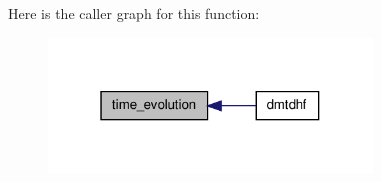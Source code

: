 Here is the caller graph for this function:\nopagebreak
\begin{figure}[H]
\begin{center}
\leavevmode
\includegraphics[width=244pt]{time__evol_8f90_a10534c39878a0b190f230860a356df23_icgraph}
\end{center}
\end{figure}


